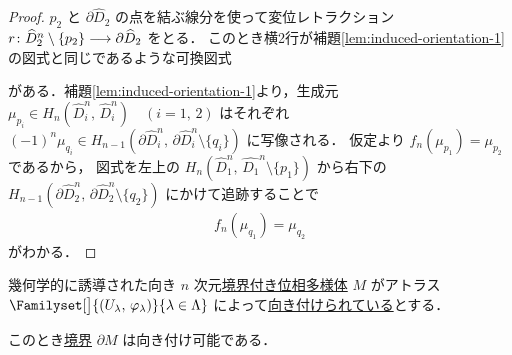 \documentclass[algtopo_main]{subfiles}
\begin{document}
\begin{proof}
    $p_2$ と $\partial \widehat{D}_2$ の点を結ぶ線分を使って変位レトラクション $r \colon \widehat{D}_2^n \setminus \{p_2\} \longrightarrow \partial\widehat{D}_2$ をとる．
    このとき横2行が補題\ref{lem:induced-orientation-1}の図式と同じであるような可換図式
    \begin{center}
    \end{center}
    がある．補題\ref{lem:induced-orientation-1}より，生成元 $\mu_{p_i} \in H_n (\widehat{D}_i^n,\, \widehat{D}_i^n)\quad (i = 1,\, 2)$ はそれぞれ $(-1)^n \mu_{q_i} \in H_{n-1} (\partial \widehat{D}^n_i,\, \partial \widehat{D}_i^n \setminus \{q_i\})$ に写像される．
    仮定より $f_n (\mu_{p_1}) = \mu_{p_2}$ であるから，
    図式を左上の $H_n (\widehat{D}_1^n,\, \widehat{D_1}^n \setminus \{p_1\})$ から右下の $H_{n-1} (\partial \widehat{D}^n_2,\, \partial \widehat{D}_2^n \setminus \{q_2\})$ にかけて追跡することで
    \begin{align}
        f_n(\mu_{q_1}) = \mu_{q_2}
    \end{align}
    がわかる．
\end{proof}

\begin{myprop}[label=prop:induced-orientation]{幾何学的に誘導された向き}
    $n$ 次元\hyperref[def:mani-with-boundary]{境界付き位相多様体} $M$ がアトラス $\Familyset[\big]{(U_\lambda,\, \varphi_\lambda)}{\lambda \in \Lambda}$ によって\hyperref[def:orientable]{向き付けられている}とする．
    
    このとき\hyperref[def:int-manifold-with-boundary]{境界} $\partial M$ は向き付け可能である．
\end{myprop}
\end{document}
